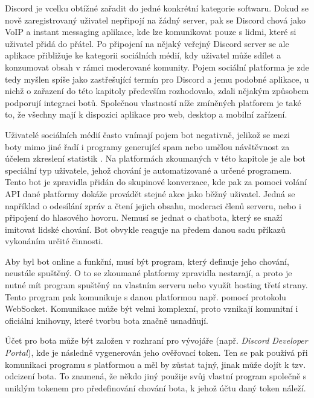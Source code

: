 \documentclass[FM]{tulthesis}
\begin{document}
	Discord je vcelku obtížné zařadit do jedné konkrétní kategorie softwaru. Dokud se nově zaregistrovaný uživatel nepřipojí na žádný server, pak se Discord chová jako VoIP a instant messaging aplikace, kde lze komunikovat pouze s lidmi, které si uživatel přidá do přátel. Po připojení na nějaký veřejný Discord server se ale aplikace přibližuje ke kategorii sociálních médií, kdy uživatel může sdílet a konzumovat obsah v rámci moderované komunity. Pojem sociální platforma je zde tedy myšlen spíše jako zastřešující termín pro Discord a jemu podobné aplikace, u nichž o zařazení do této kapitoly především rozhodovalo, zdali nějakým způsobem podporují integraci botů. Společnou vlastností níže zmíněných platforem je také to, že všechny mají k dispozici aplikace pro web, desktop a mobilní zařízení.
	
	Uživatelé sociálních médií často vnímají pojem bot negativně, jelikož se mezi boty mimo jiné řadí i programy generující spam nebo umělou návštěvnost za účelem zkreslení statistik \cite{lit_Discord}. Na platformách zkoumaných v této kapitole je ale bot speciální typ uživatele, jehož chování je automatizované a určené programem. Tento bot je zpravidla přidán do skupinové konverzace, kde pak za pomoci volání API dané platformy dokáže provádět stejné akce jako běžný uživatel. Jedná se například o odesílání zpráv a čtení jejich obsahu, moderaci členů serveru, nebo i připojení do hlasového hovoru. Nemusí se jednat o chatbota, který se snaží imitovat lidské chování. Bot obvykle reaguje na předem danou sadu příkazů vykonáním určité činnosti.
		
	Aby byl bot online a funkční, musí být program, který definuje jeho chování, neustále spuštěný. O to se zkoumané platformy zpravidla nestarají, a proto je nutné mít program spuštěný na vlastním serveru nebo využít hosting třetí strany. Tento program pak komunikuje s danou platformou např. pomocí protokolu \mbox{WebSocket}. Komunikace může být velmi komplexní, proto vznikají komunitní i oficiální knihovny, které tvorbu bota značně usnadňují.
	
	Účet pro bota může být založen v rozhraní pro vývojáře (např. \textit{Discord Developer Portal}), kde je následně vygenerován jeho ověřovací token. Ten se pak používá při komunikaci programu s platformou a měl by zůstat tajný, jinak může dojít k tzv. odcizení bota. To znamená, že někdo jiný použije svůj vlastní program společně s uniklým tokenem pro předefinování chování bota, k jehož účtu daný token náleží.
	
\end{document}
